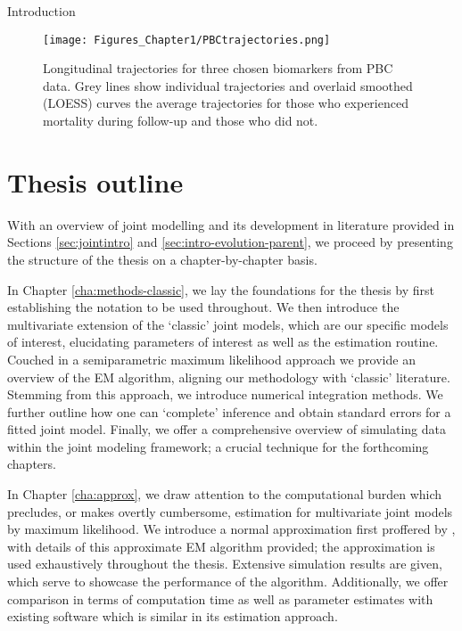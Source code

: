 \begin{chapter}{\label{cha:intro}Introduction}
  \begin{figure}[h]
      \centering
      \texttt{[image: Figures\_Chapter1/PBCtrajectories.png]}
      \caption{Longitudinal trajectories for three chosen biomarkers from PBC data. Grey lines show individual trajectories and overlaid smoothed (LOESS) curves the average trajectories for those who experienced mortality during follow-up and those who did not.}
      \label{fig:PBCtrajectories}
  \end{figure}
  
  \section{Thesis outline}\label{sec:intro-thesis-outline}
  With an overview of joint modelling and its development in literature provided in Sections \ref{sec:jointintro} and \ref{sec:intro-evolution-parent}, we proceed by presenting the structure of the thesis on a chapter-by-chapter basis.
  
  In Chapter \ref{cha:methods-classic}, we lay the foundations for the thesis by first establishing the notation to be used throughout. We then introduce the multivariate extension of the `classic' joint models, which are our specific models of interest, elucidating parameters of interest as well as the estimation routine. Couched in a semiparametric maximum likelihood approach we provide an overview of the EM algorithm, aligning our methodology with  `classic' literature. Stemming from this approach, we introduce numerical integration methods. We further outline how one can `complete' inference and obtain standard errors for a fitted joint model. Finally, we offer a comprehensive overview of simulating data within the joint modeling framework; a crucial technique for the forthcoming chapters.
  
  In Chapter \ref{cha:approx}, we draw attention to the computational burden which precludes, or makes overtly cumbersome, estimation for multivariate joint models by maximum likelihood. We introduce a normal approximation first proffered by \citet{Bernhardt15}, with details of this approximate EM algorithm provided; the approximation is used exhaustively throughout the thesis. Extensive simulation results are given, which serve to showcase the performance of the algorithm. Additionally, we offer comparison in terms of computation time as well as parameter estimates with existing software which is similar in its estimation approach.


\end{chapter}
